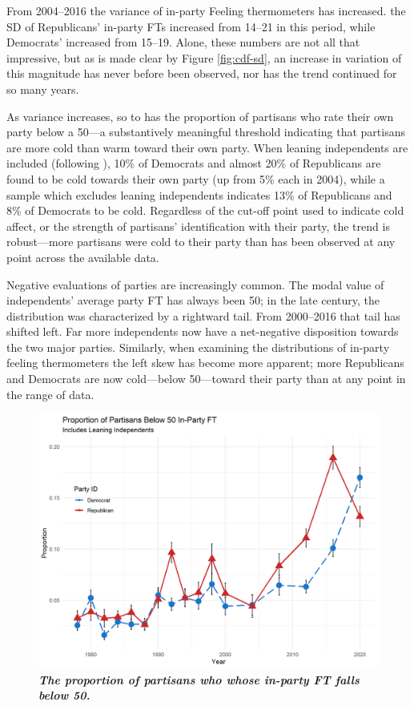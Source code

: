 \documentclass[12pt]{paper}
\begin{document}
From 2004--2016 the variance of in-party Feeling thermometers has increased. the SD of Republicans' in-party FTs increased from 14--21 in this period, while Democrats' increased from 15--19. Alone, these numbers are not all that impressive, but as is made clear by Figure \ref{fig:cdf-sd}, an increase in variation of this magnitude has never before been observed, nor has the trend continued for so many years.

As variance increases, so to has the proportion of partisans who rate their own party below a 50---a substantively meaningful threshold indicating that partisans are more cold than warm toward their own party. When leaning independents are included (following \citep{klar2016independent}), 10\% of Democrats and almost 20\% of Republicans are found to be cold towards their own party (up from 5\% each in 2004), while a sample which excludes leaning independents indicates 13\% of Republicans and 8\% of Democrats to be cold. Regardless of the cut-off point used to indicate cold affect, or the strength of partisans' identification with their party, the trend is robust---more partisans were cold to their party than has been observed at any point across the available data.

Negative evaluations of parties are increasingly common. The modal value of independents' average party FT has always been 50; in the late  century, the distribution was characterized by a rightward tail. From 2000--2016 that tail has shifted left. Far more independents now have a net-negative disposition towards the two major parties. Similarly, when examining the distributions of in-party feeling thermometers the left skew has become more apparent; more Republicans and Democrats are now cold---below 50---toward their party than at any point in the range of data.

\begin{figure}
\centering
\includegraphics[width=.7\textwidth]{cdf-below-50-ns.png}
\caption{\label{fig:cdf-below-50} \textit{\textbf{The proportion of partisans who whose in-party FT falls below 50.} %
}}
\end{figure}
\end{document}

